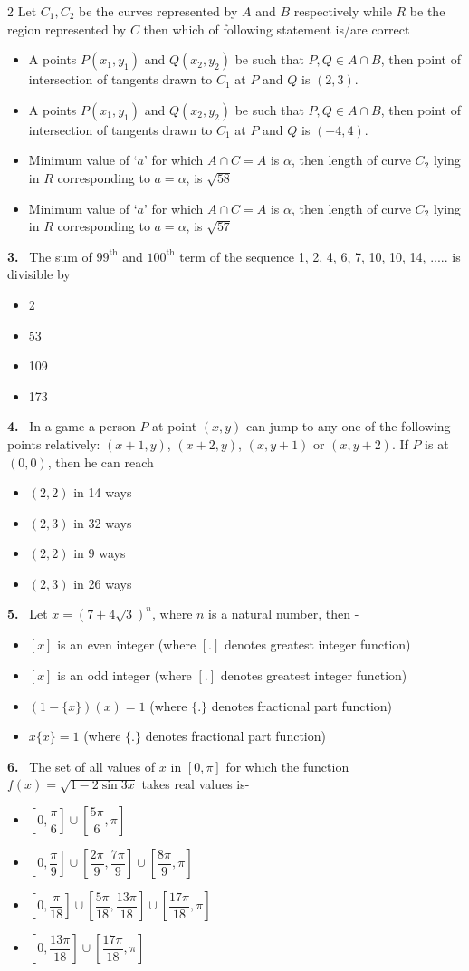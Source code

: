 \documentclass[10pt]{extarticle}
\newcommand{\qn}[1]{\par\smallskip\noindent\textbf{#1.}~}
\newenvironment{qoptions}{\begin{itemize}[leftmargin=1.8em,itemsep=1pt,topsep=2pt,label={}]}{\end{itemize}}
\newcommand{\opt}[2]{\item[(#1)] #2}
\begin{document}
\begin{multicols}{2}
Let $C_1,C_2$ be the curves represented by $A$ and $B$ respectively while $R$ be the region represented by $C$ then which of following statement is/are correct
\begin{qoptions}
\opt{A}{A points $P(x_1,y_1)$ and $Q(x_2,y_2)$ be such that $P,Q\in A\cap B$, then point of intersection of tangents drawn to $C_1$ at $P$ and $Q$ is $(2,3)$.}
\opt{B}{A points $P(x_1,y_1)$ and $Q(x_2,y_2)$ be such that $P,Q\in A\cap B$, then point of intersection of tangents drawn to $C_1$ at $P$ and $Q$ is $(-4,4)$.}
\opt{C}{Minimum value of `$a$' for which $A\cap C=A$ is $\alpha$, then length of curve $C_2$ lying in $R$ corresponding to $a=\alpha$, is $\sqrt{58}$}
\opt{D}{Minimum value of `$a$' for which $A\cap C=A$ is $\alpha$, then length of curve $C_2$ lying in $R$ corresponding to $a=\alpha$, is $\sqrt{57}$}
\end{qoptions}
\qn{3} The sum of $99^{\text{th}}$ and $100^{\text{th}}$ term of the sequence 1, 2, 4, 6, 7, 10, 10, 14, ..... is divisible by
\begin{qoptions}
\opt{A}{2}
\opt{B}{53}
\opt{C}{109}
\opt{D}{173}
\end{qoptions}
\qn{4} In a game a person $P$ at point $(x,y)$ can jump to any one of the following points relatively: $(x+1,y)$, $(x+2,y)$, $(x,y+1)$ or $(x,y+2)$. If $P$ is at $(0,0)$, then he can reach
\begin{qoptions}
\opt{A}{$(2,2)$ in 14 ways}
\opt{B}{$(2,3)$ in 32 ways}
\opt{C}{$(2,2)$ in 9 ways}
\opt{D}{$(2,3)$ in 26 ways}
\end{qoptions}
\qn{5} Let $x=(7+4\sqrt3)^n$, where $n$ is a natural number, then -
\begin{qoptions}
\opt{A}{$[x]$ is an even integer (where $[.]$ denotes greatest integer function)}
\opt{B}{$[x]$ is an odd integer (where $[.]$ denotes greatest integer function)}
\opt{C}{$(1-\{x\})(x)=1$ (where $\{.\}$ denotes fractional part function)}
\opt{D}{$x\{x\}=1$ (where $\{.\}$ denotes fractional part function)}
\end{qoptions}
\qn{6} The set of all values of $x$ in $[0,\pi]$ for which the function $f(x)=\sqrt{1-2\sin3x}$ takes real values is-
\begin{qoptions}
\opt{A}{$\left[0,\dfrac\pi6\right]\cup\left[\dfrac{5\pi}6,\pi\right]$}
\opt{B}{$\left[0,\dfrac\pi9\right]\cup\left[\dfrac{2\pi}9,\dfrac{7\pi}9\right]\cup\left[\dfrac{8\pi}9,\pi\right]$}
\opt{C}{$\left[0,\dfrac\pi{18}\right]\cup\left[\dfrac{5\pi}{18},\dfrac{13\pi}{18}\right]\cup\left[\dfrac{17\pi}{18},\pi\right]$}
\opt{D}{$\left[0,\dfrac{13\pi}{18}\right]\cup\left[\dfrac{17\pi}{18},\pi\right]$}

\end{qoptions}
\end{multicols}
\end{document}
